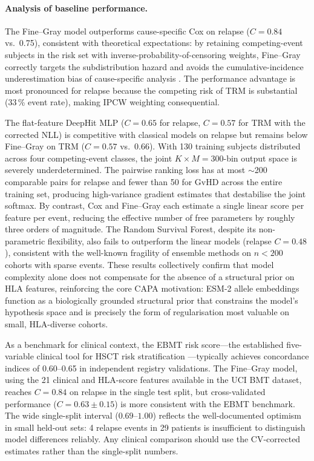 \documentclass[11pt,a4paper]{article}
\begin{document}
\paragraph{Analysis of baseline performance.}
The Fine--Gray model outperforms cause-specific Cox on relapse ($C = 0.84$
vs.\ 0.75), consistent with theoretical expectations: by retaining
competing-event subjects in the risk set with inverse-probability-of-censoring
weights, Fine--Gray correctly targets the subdistribution hazard and avoids
the cumulative-incidence underestimation bias of cause-specific analysis
\citep{putter2007competing}.  The performance advantage is most pronounced for
relapse because the competing risk of TRM is substantial (33\,\% event rate),
making IPCW weighting consequential.

The flat-feature DeepHit MLP ($C = 0.65$ for relapse, $C = 0.57$ for TRM with
the corrected NLL) is competitive with classical models on relapse but remains
below Fine--Gray on TRM ($C = 0.57$ vs.\ 0.66).  With 130 training subjects
distributed across four competing-event classes, the joint $K \times M =
300$-bin output space is severely underdetermined.  The pairwise ranking loss
has at most $\sim$200 comparable pairs for relapse and fewer than 50 for GvHD
across the entire training set, producing high-variance gradient estimates that
destabilise the joint softmax.  By contrast, Cox and Fine--Gray each estimate a
single linear score per feature per event, reducing the effective number of free
parameters by roughly three orders of magnitude.  The Random Survival Forest,
despite its non-parametric flexibility, also fails to outperform the linear
models (relapse $C = 0.48$), consistent with the well-known fragility of
ensemble methods on $n < 200$ cohorts with sparse events.  These results
collectively confirm that model complexity alone does not compensate for the
absence of a structural prior on HLA features, reinforcing the core CAPA
motivation: ESM-2 allele embeddings function as a biologically grounded
structural prior that constrains the model's hypothesis space and is precisely
the form of regularisation most valuable on small, HLA-diverse cohorts.

As a benchmark for clinical context, the EBMT risk score---the established
five-variable clinical tool for HSCT risk stratification
\citep{gratwohl2009risk}---typically achieves concordance indices of
0.60--0.65 in independent registry validations.  The Fine--Gray model,
using the 21 clinical and HLA-score features available in the UCI BMT dataset,
reaches $C = 0.84$ on relapse in the single test split, but cross-validated
performance ($C = 0.63 \pm 0.15$) is more consistent with the EBMT benchmark.
The wide single-split interval ($0.69$--$1.00$) reflects the well-documented
optimism in small held-out sets: 4 relapse events in 29 patients is insufficient
to distinguish model differences reliably.  Any clinical comparison should use
the CV-corrected estimates rather than the single-split numbers.
\end{document}
